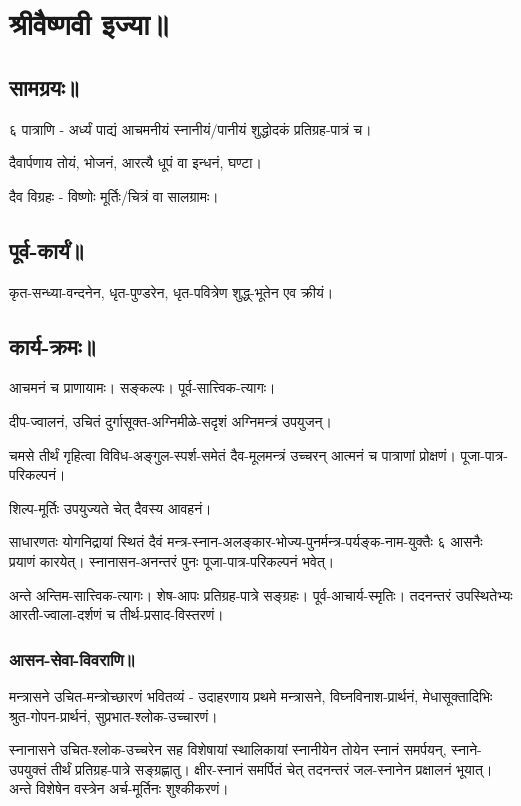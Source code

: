 \documentclass[oneside, article]{memoir}
\begin{document}
\chapter{श्रीवैष्णवी इज्या॥}
\section{सामग्रयः॥}
६ पात्राणि - अर्ध्यं पाद्यं आचमनीयं स्नानीयं/पानीयं शुद्धोदकं प्रतिग्रह-पात्रं च।

दैवार्पणाय तोयं, भोजनं, आरत्यै धूपं वा इन्धनं, घण्टा।

दैव विग्रहः - विष्णोः मूर्तिः/चित्रं वा सालग्रामः।

\section{पूर्व-कार्यं॥}
कृत-सन्ध्या-वन्दनेन, धृत-पुण्डरेन, धृत-पवित्रेण शुद्ध्-भूतेन एव क्रीयं।

\section{कार्य-क्रमः॥}
आचमनं च प्राणायामः। सङ्कल्पः। पूर्व-सात्त्विक-त्यागः।

दीप-ज्वालनं, उचितं दुर्गासूक्त-अग्निमीळे-सदृशं अग्निमन्त्रं उपयुजन्।

चमसे तीर्थं गृहित्वा विविध-अङ्गुल-स्पर्श-समेतं दैव-मूलमन्त्रं उच्चरन् आत्मनं च पात्राणां प्रोक्षणं। पूजा-पात्र-परिकल्पनं।

शिल्प-मूर्तिः उपयुज्यते चेत् दैवस्य आवहनं।

साधारणतः योगनिद्रायां स्थितं दैवं मन्त्र-स्नान-अलङ्कार-भोज्य-पुनर्मन्त्र-पर्यङ्क-नाम-युक्तैः ६ आसनैः प्रयाणं कारयेत्। स्नानासन-अनन्तरं पुनः पूजा-पात्र-परिकल्पनं भवेत्।

अन्ते अन्तिम-सात्त्विक-त्यागः। शेष-आपः प्रतिग्रह-पात्रे सङ्ग्रहः। पूर्व-आचार्य-स्मृतिः। तदनन्तरं उपस्थितेभ्यः आरती-ज्वाला-दर्शणं च तीर्थ-प्रसाद-विस्तरणं।

\subsection{आसन-सेवा-विवराणि॥}
मन्त्रासने उचित-मन्त्रोच्छारणं भवितव्यं - उदाहरणाय प्रथमे मन्त्रासने, विघ्नविनाश-प्रार्थनं, मेधासूक्तादिभिः श्रुत-गोपन-प्रार्थनं, सुप्रभात-श्लोक-उच्चारणं।

स्नानासने उचित-श्लोक-उच्चरेन सह विशेषायां स्थालिकायां स्नानीयेन तोयेन स्नानं समर्पयन्, स्नाने-उपयुक्तं तीर्थं प्रतिग्रह-पात्रे सङ्ग्रह्णातु। क्षीर-स्नानं समर्पितं चेत् तदनन्तरं जल-स्नानेन प्रक्षालनं भूयात्। अन्ते विशेषेन वस्त्रेन अर्च-मूर्तिनः शुश्कीकरणं।
\end{document}
